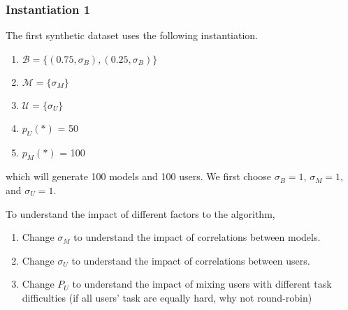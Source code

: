 \subsubsection{Instantiation 1}

The first synthetic dataset uses the following instantiation.

\begin{enumerate}
\item $\mathcal{B} = \{(0.75, \sigma_{B}), (0.25, \sigma_{B})\}$
\item $\mathcal{M} = \{\sigma_{M}\}$
\item $\mathcal{U} = \{\sigma_U\}$
\item $p_U(*)$ = 50
\item $p_M(*)$ = 100
\end{enumerate}
which will generate 100 models and 100 users. We first
choose $\sigma_{B} = 1$, $\sigma_{M} = 1$, and $\sigma_{U} = 1$.

To understand the impact of different factors to the algorithm,
\begin{enumerate}
\item Change $\sigma_{M}$ to understand the impact of
correlations between models.
\item Change $\sigma_{U}$ to understand the impact of
correlations between users.
\item Change $P_U$ to understand the impact of
mixing users with different task difficulties (if all users' task are
equally hard, why not round-robin)
\end{enumerate}








\vspace{-1em}
